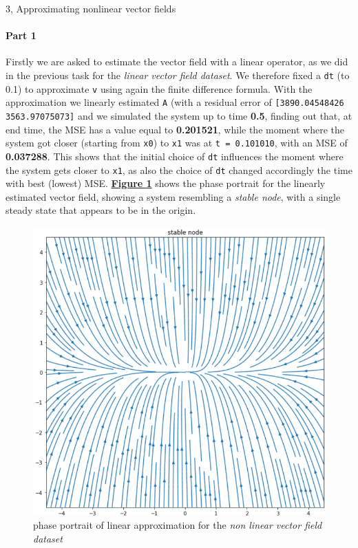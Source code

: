 \documentclass[10pt,a4paper]{article}
\begin{document}
\begin{task}{3, Approximating nonlinear vector fields}
\paragraph{Part 1}
Firstly we are asked to estimate the vector field with a linear operator, as we did in the previous task for the \textit{linear vector field dataset}. We therefore fixed a \texttt{dt} (to 0.1) to approximate \texttt{v} using again the finite difference formula. With the approximation we linearly estimated \texttt{A} (with a residual error of \texttt{[3890.04548426 3563.97075073]} and we simulated the system up to time \textbf{0.5}, finding out that, at end time, the MSE has a value equal to \textbf{0.201521}, while the moment where the system got closer (starting from \texttt{x0}) to \texttt{x1} was at \texttt{t = 0.101010}, with an MSE of \textbf{0.037288}. This shows that the initial choice of \texttt{dt} influences the moment where the system gets closer to \texttt{x1}, as also the choice of \texttt{dt} changed accordingly the time with best (lowest) MSE. \textbf{\hyperref[fig:task3-linportrait]{Figure \ref{fig:task3-linportrait}}} shows the phase portrait for the linearly estimated vector field, showing a system resembling a \textit{stable node}, with a single steady state that appears to be in the origin.
\begin{figure}[H]
    \centering
    \includegraphics[scale=0.5]{images/task3-linportrait.png}
    \caption{phase portrait of linear approximation for the \textit{non linear vector field dataset}}
    \label{fig:task3-linportrait}
\end{figure}


\end{task}
\end{document}
